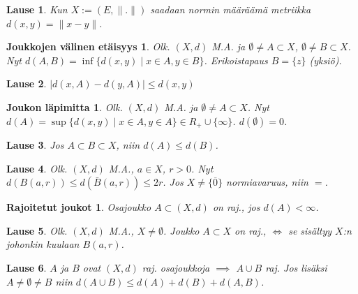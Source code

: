 \documentclass[landscape,a4paper,10pt]{article}
\theoremstyle{customtheoremstyle}
\newtheorem*{theorem}{Lause}
\begin{document}
\begin{multicols*}{3}
\begin{theorem}
  Kun $X := (E,\|.\|)$ saadaan normin määräämä metriikka $d(x,y) = \| x - y\|$.
\end{theorem}


\newtheorem*{setdist}{Joukkojen välinen etäisyys}
\begin{setdist}
  Olk. $(X,d)$ M.A. ja $\emptyset \neq A \subset X$, $\emptyset \neq B
  \subset X$. Nyt $d(A,B) = \inf \{ d(x,y) \; | \; x \in A, y \in B \}$.
  Erikoistapaus $B = \{z\}$ (yksiö).
\end{setdist}

\begin{theorem}
  $| d(x,A) - d(y,A) | \leq d(x,y)$
\end{theorem}

\newtheorem*{läpimitta}{Joukon läpimitta}
\begin{läpimitta}
  Olk. $(X,d)$ M.A. ja $\emptyset \neq A \subset X$. Nyt
  $d(A) = \sup \{d(x,y) \; | \; x \in A, y \in A\} \in R_+ \cup \{\infty\}$.
  $d(\emptyset) = 0$.
\end{läpimitta}

\begin{theorem}
  Jos $A \subset B \subset X$, niin $d(A) \leq d(B)$.
\end{theorem}


\begin{theorem}
  Olk. $(X,d)$ M.A., $a \in X$, $r > 0$. Nyt $d(B(a,r)) \leq d(\bar{B}(a,r))
  \leq 2r$. Jos $X \neq \{\overline0\}$ normiavaruus, niin $=$.
\end{theorem}

\newtheorem*{rajoitetut}{Rajoitetut joukot}
\begin{rajoitetut}
  Osajoukko $A \subset (X,d)$ on raj., jos $d(A) < \infty$.
\end{rajoitetut}

\begin{theorem}
  Olk. $(X,d)$ M.A., $X \neq \emptyset$. Joukko $A \subset X$ on raj., $\iff$
  se sisältyy $X$:n johonkin kuulaan $B(a,r)$.
\end{theorem}

\begin{theorem}
  $A$ ja $B$ ovat $(X,d)$ raj. osajoukkoja $\implies$ $A \cup B$ raj. Jos
  lisäksi $A \neq \emptyset \neq B$ niin $d(A \cup B) \leq d(A) + d(B) +
  d(A,B)$.
\end{theorem}


\end{multicols*}
\end{document}
